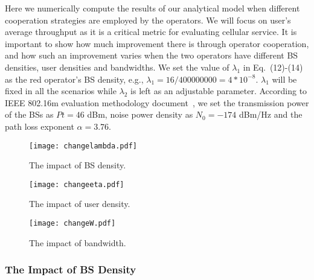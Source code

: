 \documentclass[conference]{IEEEtran}
\begin{document}
Here we numerically compute the results of our analytical model when different cooperation strategies are employed by the operators. We will focus on user's average throughput as it is a critical metric for evaluating cellular service.  It is important to show how much improvement there is through operator cooperation, and how such an improvement varies when the two operators have different BS densities, user densities and bandwidths. We set the value of $\lambda_1$ in Eq.~(12)-(14) as the red operator's BS density, e.g., $\lambda_1=16/400000000=4*10^{-8}$. $\lambda_1$ will be fixed in all the scenarios while $\lambda_2$ is left as an adjustable parameter. According to IEEE 802.16m evaluation methodology document~\cite{WiMAXEva}, we set the transmission power of the BSs as $Pt=46$ dBm, noise power density as $N_0 = -174$ dBm/Hz and the path loss exponent $\alpha = 3.76$.
\begin{figure*}[htbp]
\begin{minipage}[b]{0.36\linewidth}
\centering
\texttt{[image: changelambda.pdf]}
\caption{The impact of BS density.}
\label{fig:changelambda}
\end{minipage}
\hspace{-0.37in}
\begin{minipage}[b]{0.36\linewidth}
\centering
\texttt{[image: changeeta.pdf]}
\caption{The impact of user density.}
\label{fig:changeeta}
\end{minipage}
\hspace{-0.37in}
\begin{minipage}[b]{0.36\linewidth}
\centering
\texttt{[image: changeW.pdf]}
\caption{The impact of bandwidth.}
\label{fig:changeW}
\end{minipage}
\end{figure*}

\subsubsection{The Impact of BS Density}
\end{document}
